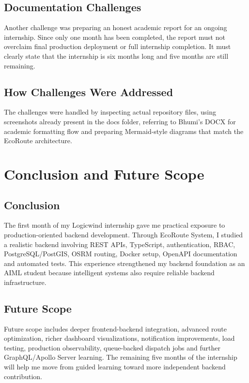 \documentclass[12pt,a4paper]{report}
\newcommand{\chapterheader}{CHAPTER HEADING}
\begin{document}
\section{Documentation Challenges}
Another challenge was preparing an honest academic report for an ongoing internship. Since only one month has been completed, the report must not overclaim final production deployment or full internship completion. It must clearly state that the internship is six months long and five months are still remaining.

\section{How Challenges Were Addressed}
The challenges were handled by inspecting actual repository files, using screenshots already present in the docs folder, referring to Bhumi's DOCX for academic formatting flow and preparing Mermaid-style diagrams that match the EcoRoute architecture.
\clearpage

\renewcommand{\chapterheader}{CHAPTER 11}
\chapter{Conclusion and Future Scope}
\section{Conclusion}
The first month of my Logicwind internship gave me practical exposure to production-oriented backend development. Through EcoRoute System, I studied a realistic backend involving REST APIs, TypeScript, authentication, RBAC, PostgreSQL/PostGIS, OSRM routing, Docker setup, OpenAPI documentation and automated tests. This experience strengthened my backend foundation as an AIML student because intelligent systems also require reliable backend infrastructure.

\section{Future Scope}
Future scope includes deeper frontend-backend integration, advanced route optimization, richer dashboard visualizations, notification improvements, load testing, production observability, queue-backed dispatch jobs and further GraphQL/Apollo Server learning. The remaining five months of the internship will help me move from guided learning toward more independent backend contribution.
\clearpage

\renewcommand{\chapterheader}{REFERENCES}
\end{document}
